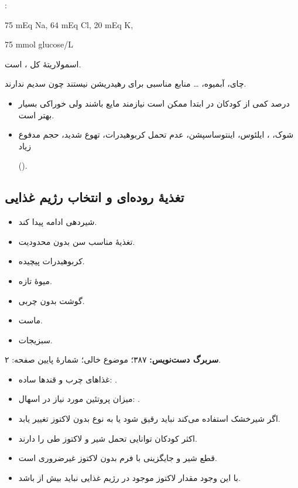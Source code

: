 \documentclass[12pt,a4paper]{article}
\begin{document}
:
\begin{latin}
75 mEq Na, 64 mEq Cl, 20 mEq K,

75 mmol glucose/L
\end{latin}
اسمولاریتهٔ کل ،  است.

چای، آبمیوه، \ldots{} منابع مناسبی برای رهیدریشن نیستند چون سدیم ندارند.

\begin{itemize}
\item درصد کمی از کودکان در ابتدا ممکن است نیازمند مایع  باشند ولی  خوراکی بسیار بهتر است.
\item شوک، ، ایلئوس، اینتوساسپشن، عدم تحمل کربوهیدرات، تهوع شدید، حجم مدفوع زیاد
\par ().
\end{itemize}

\subsection*{تغذیهٔ روده‌ای و انتخاب رژیم غذایی}
\begin{itemize}
\item شیردهی ادامه پیدا کند.
\item تغذیهٔ مناسب سن بدون محدودیت.
\item کربوهیدرات پیچیده.
\item میوهٔ تازه.
\item گوشت بدون چربی.
\item ماست.
\item سبزیجات.
\end{itemize}

\textbf{سربرگ دست‌نویس:} ۳۸۷؛ موضوع خالی؛ شمارهٔ پایین صفحه: ۲.

\begin{itemize}
\item غذاهای چرب و قندها ساده: \AGEMath{\times}.
\item میزان پروتئین مورد نیاز در اسهال: .
\item اگر شیرخشک استفاده می‌کند نباید رقیق شود یا به نوع بدون لاکتوز تغییر یابد.
\item اکثر کودکان توانایی تحمل شیر و لاکتوز طی  را دارند.
\item قطع شیر و جایگزینی با فرم بدون لاکتوز غیرضروری است.
\item با این وجود مقدار لاکتوز موجود در رژیم غذایی نباید بیش از  باشد.
\end{itemize}
\end{document}
